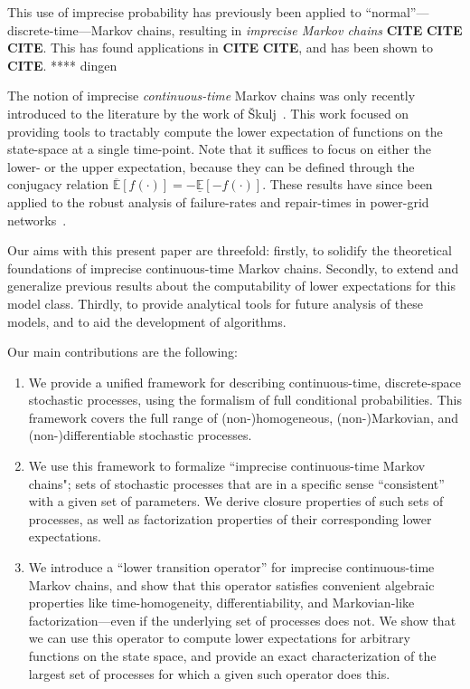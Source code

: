 \documentclass[10pt,a4paper]{paper}
\theoremstyle{definition}
\begin{document}
This use of imprecise probability has previously been applied to ``normal''---discrete-time---Markov chains, resulting in \emph{imprecise Markov chains} {\bf CITE} {\bf CITE} {\bf CITE}. This has found applications in {\bf CITE} {\bf CITE}, and has been shown to {\bf CITE}. **** dingen

The notion of imprecise \emph{continuous-time} Markov chains was only recently introduced to the literature by the work of {\v{S}}kulj~\cite{Skulj:2015cq}. This work focused on providing tools to tractably compute the lower expectation of functions on the state-space at a single time-point. Note that it suffices to focus on either the lower- or the upper expectation, because they can be defined through the conjugacy relation $\overline{\mathbb{E}}[f(\cdot)]=-\underline{\mathbb{E}}[-f(\cdot)]$. These results have since been applied to the robust analysis of failure-rates and repair-times in power-grid networks~\cite{troffaes2015using}.

Our aims with this present paper are threefold: firstly, to solidify the theoretical foundations of imprecise continuous-time Markov chains. Secondly, to extend and generalize previous results about the computability of lower expectations for this model class. Thirdly, to provide analytical tools for future analysis of these models, and to aid the development of algorithms.

Our main contributions are the following:
\begin{enumerate}
\item We provide a unified framework for describing continuous-time, discrete-space stochastic processes, using the formalism of full conditional probabilities. This framework covers the full range of (non-)homogeneous, (non-)Markovian, and (non-)differentiable stochastic processes.
\item We use this framework to formalize ``imprecise continuous-time Markov chains"; sets of stochastic processes that are in a specific sense ``consistent'' with a given set of parameters. We derive closure properties of such sets of processes, as well as factorization properties of their corresponding lower expectations.
\item We introduce a ``lower transition operator'' for imprecise continuous-time Markov chains, and show that this operator satisfies convenient algebraic properties like time-homogeneity, differentiability, and Markovian-like factorization---even if the underlying set of processes does not. We show that we can use this operator to compute lower expectations for arbitrary functions on the state space, and provide an exact characterization of the largest set of processes for which a given such operator does this.
\end{enumerate}
\end{document}
